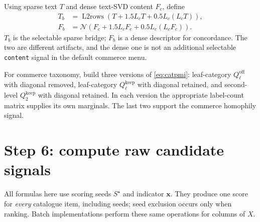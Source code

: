 \documentclass[11pt,a4paper]{article}
\newcommand{\code}[1]{\nolinkurl{#1}}
\newcommand{\normrows}{\mathcal N}
\numberwithin{equation}{section}
\begin{document}
Using sparse text $T$ and dense text-SVD content $F_c$, define
\begin{align}
 T_b&=\operatorname{L2rows}(T+1.5L_cT+0.5L_c(L_cT)),\\
 F_b&=\normrows(F_c+1.5L_cF_c+0.5L_c(L_cF_c)).
\end{align}
$T_b$ is the selectable sparse bridge; $F_b$ is a dense descriptor for concordance.
The two are different artifacts, and the dense one is not an additional selectable
\code{content} signal in the default commerce menu.

For commerce taxonomy, build three versions of \eqref{eq:catpmi}: leaf-category
$Q_\ell^{\mathrm{off}}$ with diagonal removed, leaf-category $Q_\ell^{\mathrm{keep}}$
with diagonal retained, and second-level $Q_2^{\mathrm{keep}}$ with diagonal retained.
In each version the appropriate label-count matrix supplies its own marginals. The
last two support the commerce homophily signal.

\section{Step 6: compute raw candidate signals}\label{sec:signals}
All formulas here use scoring seeds $S^\star$ and indicator $\bm x$. They produce one
score for \emph{every} catalogue item, including seeds; seed exclusion occurs only when
ranking. Batch implementations perform these same operations for columns of $X$.
\end{document}
